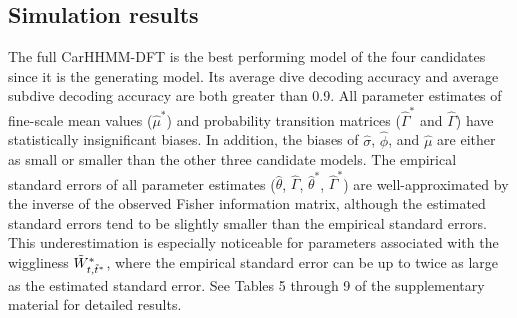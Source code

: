 
\subsection{Simulation results}

The full CarHHMM-DFT is the best performing model of the four candidates since it is the generating model. Its average dive decoding accuracy and average subdive decoding accuracy are both greater than 0.9. All parameter estimates of fine-scale mean values ($\hat \mu^*$) and probability transition matrices ($\hat \Gamma^*$ and $\hat \Gamma$) have statistically insignificant biases. In addition, the biases of $\hat \sigma$, $\hat \phi$, and $\hat \mu$ are either as small or smaller than the other three candidate models. The empirical standard errors of all parameter estimates ($\hat \theta$, $\hat \Gamma$, $\hat \theta^*$, $\hat \Gamma^*$) are well-approximated by the inverse of the observed Fisher information matrix, although the estimated standard errors tend to be slightly smaller than the empirical standard errors. This underestimation is especially noticeable for parameters associated with the wiggliness $\tilde{W}^*_{t,\tilde t^*}$, where the empirical standard error can be up to twice as large as the estimated standard error. See Tables 5 through 9 of the supplementary material for detailed results.

